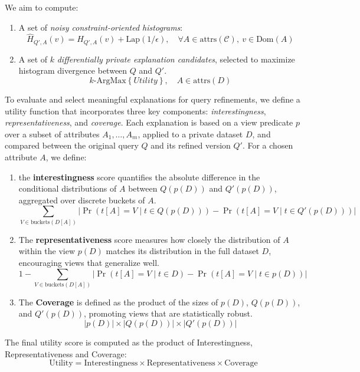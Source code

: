 We aim to compute:

\begin{enumerate}
    \item A set of {\it noisy constraint-oriented histograms}:
    $$
    \hat{H}_{Q',A}(v) = H_{Q',A}(v) + \text{Lap}(1/\epsilon), \quad \forall A \in \text{attrs}(\mathcal{C}), \ v \in \text{Dom}(A)
    $$
    \item A set of $k$ {\it differentially private explanation candidates}, selected to maximize histogram divergence between $Q$ and $Q'$.
    $$
    k\text{-ArgMax} \left\{ Utility \right\}, \quad A \in \text{attrs}(D)
    $$
\end{enumerate}

To evaluate and select meaningful explanations for query refinements, we define a utility function that incorporates three key components: \textit{interestingness}, \textit{representativeness}, and \textit{coverage}. Each explanation is based on a view predicate $p$ over a subset of attributes $A_1, \dots, A_m$,  applied to a private dataset $D$, and compared between the original query $Q$ and its refined version $Q'$. For a chosen attribute $A$, we define:
\begin{enumerate}
    \item the \textbf{interestingness} score quantifies the absolute difference in the conditional distributions of $A$ between $Q(p(D))$ and $Q'(p(D))$, aggregated over discrete buckets of $A$.
    \[
\sum_{V \in \text{buckets}(D[A])} \left| \Pr(t[A] = V \mid t \in Q(p(D))) - \Pr(t[A] = V \mid t \in Q'(p(D))) \right|
\]

    \item The \textbf{representativeness} score measures how closely the distribution of $A$ within the view $p(D)$ matches its distribution in the full dataset $D$, encouraging views that generalize well. 
    \[
1 - \sum_{V \in \text{buckets}(D[A])} \left| \Pr(t[A] = V \mid t \in D) - \Pr(t[A] = V \mid t \in p(D)) \right|
\]

    \item The \textbf{Coverage} is defined as the product of the sizes of $p(D)$, $Q(p(D))$, and $Q'(p(D))$, promoting views that are statistically robust.
    \[
    |p(D)| \times |Q(p(D))| \times |Q'(p(D))|
\]

\end{enumerate}
  The final utility score is computed as the product of Interestingness, Representativeness and Coverage:
  \[
\text{Utility} = \text{Interestingness} \times \text{Representativeness} \times \text{Coverage}
\]


